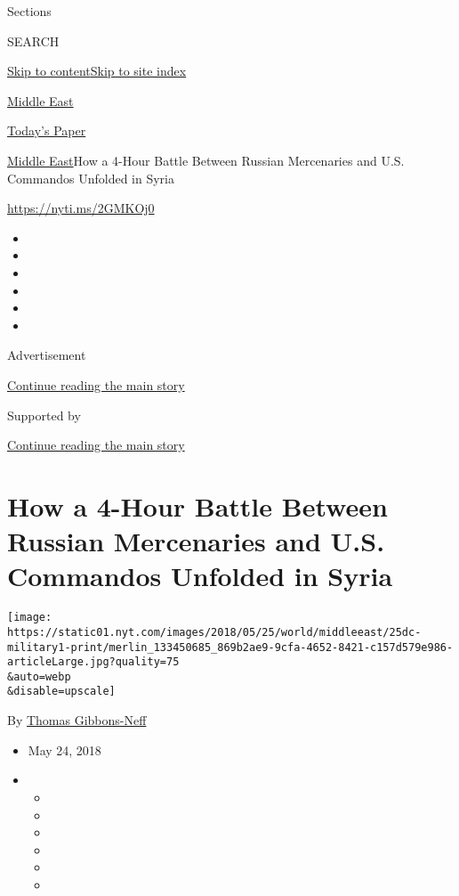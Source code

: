 Sections

SEARCH

\protect\hyperlink{site-content}{Skip to
content}\protect\hyperlink{site-index}{Skip to site index}

\href{https://www.nytimes.com/section/world/middleeast}{Middle East}

\href{https://myaccount.nytimes.com/auth/login?response_type=cookie\&client_id=vi}{}

\href{https://www.nytimes.com/section/todayspaper}{Today's Paper}

\href{/section/world/middleeast}{Middle East}\textbar{}How a 4-Hour
Battle Between Russian Mercenaries and U.S. Commandos Unfolded in Syria

\url{https://nyti.ms/2GMKOj0}

\begin{itemize}
\item
\item
\item
\item
\item
\item
\end{itemize}

Advertisement

\protect\hyperlink{after-top}{Continue reading the main story}

Supported by

\protect\hyperlink{after-sponsor}{Continue reading the main story}

\hypertarget{how-a-4-hour-battle-between-russian-mercenaries-and-us-commandos-unfolded-in-syria}{%
\section{How a 4-Hour Battle Between Russian Mercenaries and U.S.
Commandos Unfolded in
Syria}\label{how-a-4-hour-battle-between-russian-mercenaries-and-us-commandos-unfolded-in-syria}}

\texttt{[image: https://static01.nyt.com/images/2018/05/25/world/middleeast/25dc-military1-print/merlin\_133450685\_869b2ae9-9cfa-4652-8421-c157d579e986-articleLarge.jpg?quality=75\\\&auto=webp\\\&disable=upscale]}

By \href{https://www.nytimes.com/by/thomas-gibbons-neff}{Thomas
Gibbons-Neff}

\begin{itemize}
\item
  May 24, 2018
\item
  \begin{itemize}
  \item
  \item
  \item
  \item
  \item
  \item
  \end{itemize}
\end{itemize}

